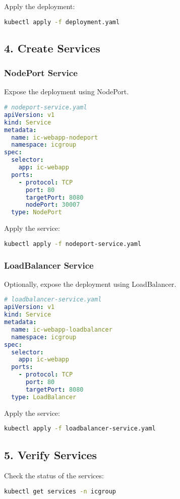 \documentclass{article}
\begin{document}
Apply the deployment:
\begin{lstlisting}[language=bash]
kubectl apply -f deployment.yaml
\end{lstlisting}

\subsection*{4. Create Services}

\subsubsection*{NodePort Service}
Expose the deployment using NodePort.
\begin{lstlisting}[language=yaml]
# nodeport-service.yaml
apiVersion: v1
kind: Service
metadata:
  name: ic-webapp-nodeport
  namespace: icgroup
spec:
  selector:
    app: ic-webapp
  ports:
    - protocol: TCP
      port: 80
      targetPort: 8080
      nodePort: 30007
  type: NodePort
\end{lstlisting}

Apply the service:
\begin{lstlisting}[language=bash]
kubectl apply -f nodeport-service.yaml
\end{lstlisting}

\subsubsection*{LoadBalancer Service}
Optionally, expose the deployment using LoadBalancer.
\begin{lstlisting}[language=yaml]
# loadbalancer-service.yaml
apiVersion: v1
kind: Service
metadata:
  name: ic-webapp-loadbalancer
  namespace: icgroup
spec:
  selector:
    app: ic-webapp
  ports:
    - protocol: TCP
      port: 80
      targetPort: 8080
  type: LoadBalancer
\end{lstlisting}

Apply the service:
\begin{lstlisting}[language=bash]
kubectl apply -f loadbalancer-service.yaml
\end{lstlisting}

\subsection*{5. Verify Services}
Check the status of the services:
\begin{lstlisting}[language=bash]
kubectl get services -n icgroup
\end{lstlisting}
\end{document}
